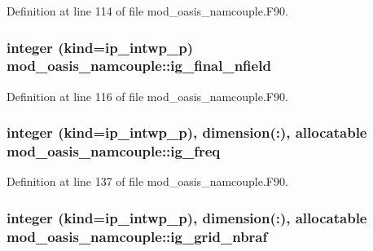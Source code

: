 Definition at line 114 of file mod\+\_\+oasis\+\_\+namcouple.\+F90.

\hypertarget{classmod__oasis__namcouple_a7cf04d6fb678ee65b7fbedc56a0d680a}{
\subsubsection[{ig\+\_\+final\+\_\+nfield}]{\setlength{\rightskip}{0pt plus 5cm}integer (kind=ip\+\_\+intwp\+\_\+p) mod\+\_\+oasis\+\_\+namcouple\+::ig\+\_\+final\+\_\+nfield\hspace{0.3cm}{\ttfamily [private]}}}\label{classmod__oasis__namcouple_a7cf04d6fb678ee65b7fbedc56a0d680a}


Definition at line 116 of file mod\+\_\+oasis\+\_\+namcouple.\+F90.

\hypertarget{classmod__oasis__namcouple_affa727bb033c0f4d09962f2b4d1b4ab5}{
\subsubsection[{ig\+\_\+freq}]{\setlength{\rightskip}{0pt plus 5cm}integer (kind=ip\+\_\+intwp\+\_\+p), dimension(\+:), allocatable mod\+\_\+oasis\+\_\+namcouple\+::ig\+\_\+freq\hspace{0.3cm}{\ttfamily [private]}}}\label{classmod__oasis__namcouple_affa727bb033c0f4d09962f2b4d1b4ab5}


Definition at line 137 of file mod\+\_\+oasis\+\_\+namcouple.\+F90.

\hypertarget{classmod__oasis__namcouple_a8e8c38746c6c35b13d2d9b934835188c}{
\subsubsection[{ig\+\_\+grid\+\_\+nbraf}]{\setlength{\rightskip}{0pt plus 5cm}integer (kind=ip\+\_\+intwp\+\_\+p), dimension(\+:), allocatable mod\+\_\+oasis\+\_\+namcouple\+::ig\+\_\+grid\+\_\+nbraf\hspace{0.3cm}{\ttfamily [private]}}}\label{classmod__oasis__namcouple_a8e8c38746c6c35b13d2d9b934835188c}



